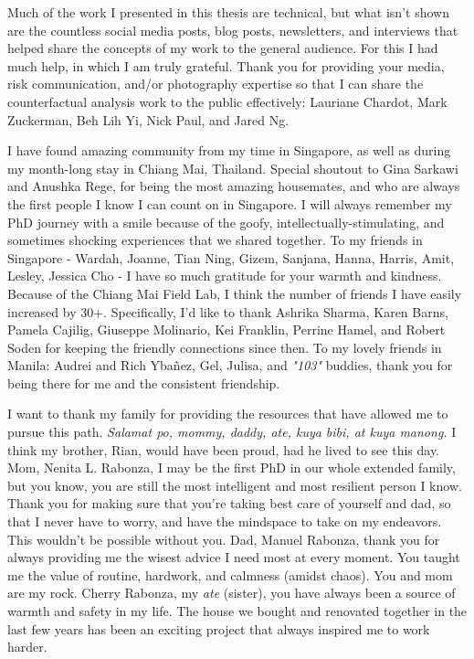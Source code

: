 {Much of the work I presented in this thesis are technical, but what isn't shown are the countless social media posts, blog posts, newsletters, and interviews that helped share the concepts of my work to the general audience. For this I had much help, in which I am truly grateful. Thank you for providing your media, risk communication, and/or photography expertise so that I can share the counterfactual analysis work to the public effectively: Lauriane Chardot, Mark Zuckerman, Beh Lih Yi, Nick Paul, and Jared Ng.

I have found amazing community from my time in Singapore, as well as during my month-long stay in Chiang Mai, Thailand.  Special shoutout to Gina Sarkawi and Anushka Rege, for being the most amazing housemates, and who are always the first people I know I can count on in Singapore. I will always remember my PhD journey with a smile because of the goofy, intellectually-stimulating, and sometimes shocking experiences that we shared together. To my friends in Singapore - Wardah, Joanne, Tian Ning, Gizem, Sanjana, Hanna, Harris, Amit, Lesley, Jessica Cho - I have so much gratitude for your warmth and kindness. Because of the Chiang Mai Field Lab, I think the number of friends I have easily increased by 30+. Specifically, I'd like to thank Ashrika Sharma, Karen Barns, Pamela Cajilig, Giuseppe Molinario, Kei Franklin, Perrine Hamel, and Robert Soden for keeping the friendly connections since then. To my lovely friends in Manila: Audrei and Rich Yba\~{n}ez, Gel, Julisa, and \textit{"103"} buddies, thank you for being there for me and the consistent friendship.

I want to thank my family for providing the resources that have allowed me to pursue this path. \textit{Salamat po, mommy, daddy, ate, kuya bibi, at kuya manong.} I think my brother, Rian, would have been proud, had he lived to see this day. Mom, Nenita L. Rabonza, I may be the first PhD in our whole extended family, but you know, you are still the most intelligent and most resilient person I know. Thank you for making sure that you’re taking best care of yourself and dad, so that I never have to worry, and have the mindspace to take on my endeavors. This wouldn’t be possible without you. Dad, Manuel Rabonza, thank you for always providing me the wisest advice I need most at every moment. You taught me the value of routine, hardwork, and calmness (amidst chaos). You and mom are my rock. Cherry Rabonza, my \textit{ate} (sister), you have always been a source of warmth and safety in my life. The house we bought and renovated together in the last few years has been an exciting project that always inspired me to work harder. %

}
